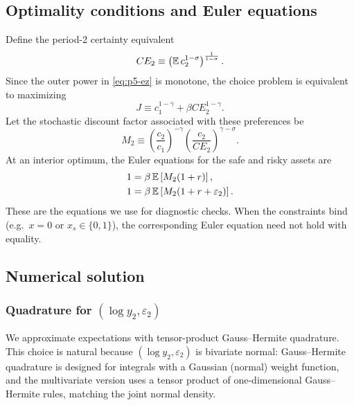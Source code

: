 \subsection{Optimality conditions and Euler equations}

Define the period-2 certainty equivalent
\begin{equation}
  CE_2 \equiv \left(\mathbb{E}\,c_2^{1-\sigma}\right)^{\frac{1}{1-\sigma}}.
\end{equation}
Since the outer power in \eqref{eq:p5-ez} is monotone, the choice problem is equivalent to maximizing
\begin{equation}
  J \equiv c_1^{1-\gamma} + \beta CE_2^{1-\gamma}.
\end{equation}
Let the stochastic discount factor associated with these preferences be
\begin{equation}
  M_2
  \equiv
  \left(\frac{c_2}{c_1}\right)^{-\gamma}
  \left(\frac{c_2}{CE_2}\right)^{\gamma-\sigma}.
  \label{eq:p5-sdf}
\end{equation}
At an interior optimum, the Euler equations for the safe and risky assets are
\begin{align}
\begin{split}
  1 &= \beta\,\mathbb{E}\left[ M_2 (1+r) \right],\\
  1 &= \beta\,\mathbb{E}\left[ M_2 (1+r+\varepsilon_2) \right].
\end{split}\label{eq:p5-euler}
\end{align}
These are the equations we use for diagnostic checks. When the constraints bind (e.g.\ $x=0$ or $x_s \in \{0,1\}$), the corresponding Euler equation need not hold with equality.

\subsection{Numerical solution}

\subsubsection{Quadrature for $(\log y_2,\varepsilon_2)$}

We approximate expectations with tensor-product Gauss--Hermite quadrature. This choice is natural because $(\log y_2,\varepsilon_2)$ is bivariate normal: Gauss--Hermite quadrature is designed for integrals with a Gaussian (normal) weight function, and the multivariate version uses a tensor product of one-dimensional Gauss--Hermite rules, matching the joint normal density.

